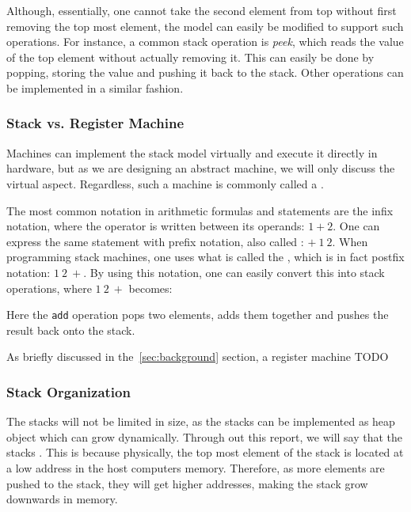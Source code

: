 
Although, essentially, one cannot take the second element from top without first
removing the top most element, the model can easily be modified to support such
operations. For instance, a common stack operation is {\it peek}, which reads
the value of the top element without actually removing it. This can easily be
done by popping, storing the value and pushing it back to the stack. Other
operations can be implemented in a similar fashion.

\subsubsection{Stack vs. Register Machine}
Machines can implement the stack model virtually and execute it directly in
hardware, but as we are designing an abstract machine, we will only discuss the
virtual aspect. Regardless, such a machine is commonly called a .

The most common notation in arithmetic formulas and statements are the infix
notation, where the operator is written between its operands: $1 + 2$. One can
express the same statement with prefix notation, also called : $+\ 1\ 2$. When programming stack machines, one uses what is called
the , which is in fact postfix notation:
$1\ 2\ +$. By using this notation, one can easily convert this into stack
operations, where $1\ 2\ +$ becomes:
\begin{stackops}
\end{stackops}

Here the {\tt add} operation pops two elements, adds them together and pushes
the result back onto the stack.

As briefly discussed in the~\ref{sec:background} section, a register machine
TODO

\subsubsection{Stack Organization}

The stacks will not be limited in size, as the stacks can be implemented as heap
object which can grow dynamically. Through out this report, we will say that the
stacks . This is because physically, the top most element
of the stack is located at a low address in the host computers
memory. Therefore, as more elements are pushed to the stack, they will get
higher addresses, making the stack grow downwards in memory.

